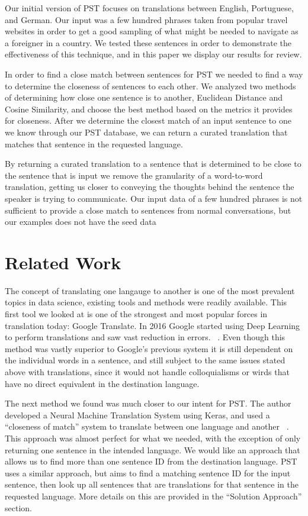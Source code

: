 \documentclass[runningheads]{llncs}
\begin{document}
	Our initial version of PST focuses on translations between English, Portuguese, and German. Our input was a few hundred phrases taken from popular travel websites in order to get a good sampling of what might be needed to navigate as a foreigner in a country. We tested these sentences in order to demonstrate the effectiveness of this technique, and in this paper we display our results for review. 

	In order to find a close match between sentences for PST we needed to find a way to determine the closeness of sentences to each other. We analyzed two  methods of determining how close one sentence is to another, Euclidean Distance and Cosine Similarity, and choose the best method based on the metrics it provides for closeness. After we determine the closest match of an input sentence to one we know through our PST database, we can return a curated translation that matches that sentence in the requested language.

	By returning a curated translation to a sentence that is determined to be close to the sentence that is input we remove the granularity of a word-to-word translation, getting us closer to conveying the thoughts behind the sentence the speaker is trying to communicate. Our input data of a few hundred phrases is not sufficient to provide a close match to sentences from normal conversations, but our examples does not have the seed data 
	
	\section{Related Work}
	The concept of translating one langauge to another is one of the most prevalent topics in data science, existing tools and methods were readily available. This first tool we looked at is one of the strongest and most popular forces in translation today: Google Translate. In 2016 Google started using Deep Learning  to perform translations and saw vast reduction in errors. ~\cite{ref_url18}. Even though this method was vastly superior to Google's previous system it is still dependent on the individual words in a sentence, and still subject to the same issues stated above with translations, since it would not handle colloquialisms or wirds that have no direct equivalent in the destination language. 

	The next method we found was much closer to our intent for PST. The author developed a Neural Machine Translation System using Keras, and used a ``closeness of match'' system to translate between one language and another ~\cite{ref_url16}. This approach was almost perfect for what we needed, with the exception of only returning one sentence in the intended language. We would like an approach that allows us to find more than one sentence ID from the destination language. PST uses a similar approach, but aims to find a matching sentence ID for the input sentence, then look up all sentences that are translations for that sentence in the requested language. More details on this are provided in the ``Solution Approach'' section.
	
\end{document}
